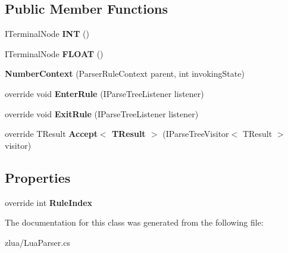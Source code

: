 \subsection*{Public Member Functions}
\begin{DoxyCompactItemize}
\item 
\mbox{\label{classzlua_1_1_lua_parser_1_1_number_context_a22a86853a34c1fbe6045a13b7497a067}} 
I\+Terminal\+Node {\bfseries I\+NT} ()
\item 
\mbox{\label{classzlua_1_1_lua_parser_1_1_number_context_aa21d3696aba45f3cf7ee388ac1c9dcac}} 
I\+Terminal\+Node {\bfseries F\+L\+O\+AT} ()
\item 
\mbox{\label{classzlua_1_1_lua_parser_1_1_number_context_ae3913e5e5841af2ed31bc53bb3d2f68e}} 
{\bfseries Number\+Context} (Parser\+Rule\+Context parent, int invoking\+State)
\item 
\mbox{\label{classzlua_1_1_lua_parser_1_1_number_context_a35b5e585803a7dcfe3026b0fbde65d49}} 
override void {\bfseries Enter\+Rule} (I\+Parse\+Tree\+Listener listener)
\item 
\mbox{\label{classzlua_1_1_lua_parser_1_1_number_context_a845bc4423a3da7670858fe496459e3b5}} 
override void {\bfseries Exit\+Rule} (I\+Parse\+Tree\+Listener listener)
\item 
\mbox{\label{classzlua_1_1_lua_parser_1_1_number_context_a52726bdd9f85f4b090e41ef7efeda8e1}} 
override T\+Result {\bfseries Accept$<$ T\+Result $>$} (I\+Parse\+Tree\+Visitor$<$ T\+Result $>$ visitor)
\end{DoxyCompactItemize}
\subsection*{Properties}
\begin{DoxyCompactItemize}
\item 
\mbox{\label{classzlua_1_1_lua_parser_1_1_number_context_a82f11c2a87da9dcd4adae21dbbd4a684}} 
override int {\bfseries Rule\+Index}
\end{DoxyCompactItemize}


The documentation for this class was generated from the following file\+:\begin{DoxyCompactItemize}
\item 
zlua/Lua\+Parser.\+cs\end{DoxyCompactItemize}
